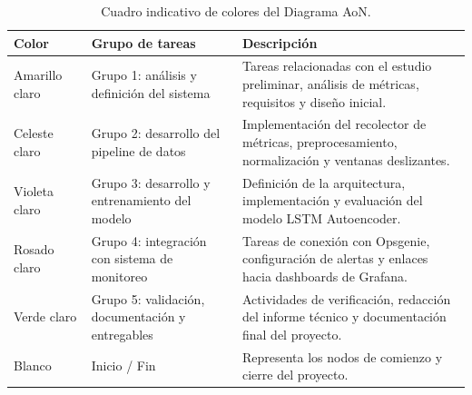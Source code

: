 \documentclass[
11pt, %
]{charter}
\begin{document}
\begin{table}[H]
\centering
\begin{tabular}{|>{\centering\arraybackslash}p{0.17\linewidth}|>{\raggedright\arraybackslash}p{0.33\linewidth}|>{\raggedright\arraybackslash}p{0.5\linewidth}|}
\hline
\rowcolor[HTML]{EFEFEF}
\textbf{Color} & \textbf{Grupo de tareas} & \textbf{Descripción} \\ \hline

\cellcolor[HTML]{FFF2CC} Amarillo claro & Grupo 1: análisis y definición del sistema& Tareas relacionadas con el estudio preliminar, análisis de métricas, requisitos y diseño inicial. \\ \hline

\cellcolor[HTML]{DAE8FC} Celeste claro & Grupo 2: desarrollo del pipeline de datos& Implementación del recolector de métricas, preprocesamiento, normalización y ventanas deslizantes. \\ \hline

\cellcolor[HTML]{E1D5E7} Violeta claro & Grupo 3: desarrollo y entrenamiento del modelo& Definición de la arquitectura, implementación y evaluación del modelo LSTM Autoencoder. \\ \hline

\cellcolor[HTML]{F8CECC} Rosado claro & Grupo 4: integración con sistema de monitoreo& Tareas de conexión con Opsgenie, configuración de alertas y enlaces hacia dashboards de Grafana. \\ \hline

\cellcolor[HTML]{D5E8D4} Verde claro & Grupo 5: validación, documentación y entregables& Actividades de verificación, redacción del informe técnico y documentación final del proyecto. \\ \hline

\cellcolor[HTML]{FFFFFF} Blanco & Inicio / Fin & Representa los nodos de comienzo y cierre del proyecto. \\ \hline

\end{tabular}
\caption{Cuadro indicativo de colores del Diagrama AoN.}
\end{table}
\end{document}
